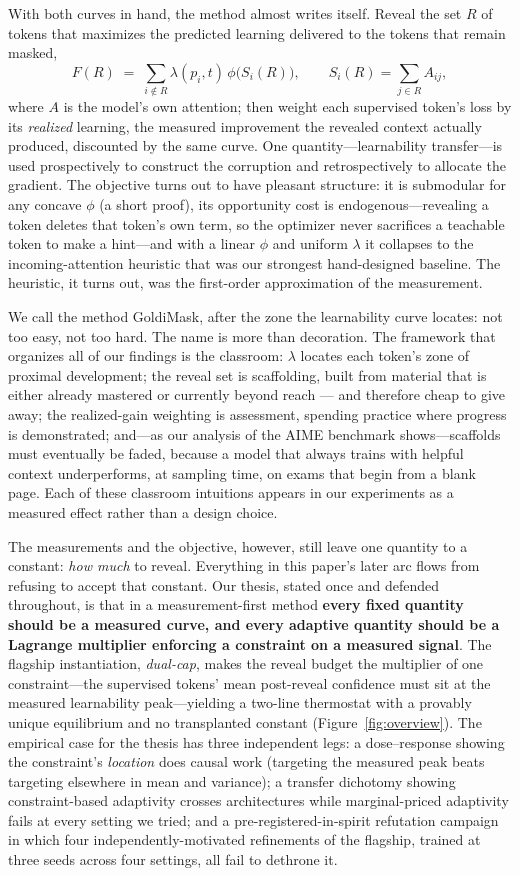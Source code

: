 \documentclass{article} %
\begin{document}
With both curves in hand, the method almost writes itself. Reveal the set $R$ of tokens that maximizes the predicted learning delivered to the tokens that remain masked,
\[
F(R) \;=\; \sum_{i \notin R} \lambda(p_i, t)\, \phi\!\big(S_i(R)\big),
\qquad S_i(R) = \sum_{j \in R} A_{ij},
\]
where $A$ is the model's own attention; then weight each supervised token's loss by its \emph{realized} learning, the measured improvement the revealed context actually produced, discounted by the same curve. One quantity---learnability transfer---is used prospectively to construct the corruption and retrospectively to allocate the gradient. The objective turns out to have pleasant structure: it is submodular for any concave $\phi$ (a short proof), its opportunity cost is endogenous---revealing a token deletes that token's own term, so the optimizer never sacrifices a teachable token to make a hint---and with a linear $\phi$ and uniform $\lambda$ it collapses to the incoming-attention heuristic that was our strongest hand-designed baseline. The heuristic, it turns out, was the first-order approximation of the measurement.

We call the method GoldiMask, after the zone the learnability curve locates: not too easy, not too hard. The name is more than decoration. The framework that organizes all of our findings is the classroom: $\lambda$ locates each token's zone of proximal development; the reveal set is scaffolding, built from material that is either already mastered or currently beyond reach --- and therefore cheap to give away; the realized-gain weighting is assessment, spending practice where progress is demonstrated; and---as our analysis of the AIME benchmark shows---scaffolds must eventually be faded, because a model that always trains with helpful context underperforms, at sampling time, on exams that begin from a blank page. Each of these classroom intuitions appears in our experiments as a measured effect rather than a design choice.

The measurements and the objective, however, still leave one quantity to a constant: \emph{how much} to reveal. Everything in this paper's later arc flows from refusing to accept that constant. Our thesis, stated once and defended throughout, is that in a measurement-first method \textbf{every fixed quantity should be a measured curve, and every adaptive quantity should be a Lagrange multiplier enforcing a constraint on a measured signal}. The flagship instantiation, \emph{dual-cap}, makes the reveal budget the multiplier of one constraint---the supervised tokens' mean post-reveal confidence must sit at the measured learnability peak---yielding a two-line thermostat with a provably unique equilibrium and no transplanted constant (Figure~\ref{fig:overview}). The empirical case for the thesis has three independent legs: a dose--response showing the constraint's \emph{location} does causal work (targeting the measured peak beats targeting elsewhere in mean and variance); a transfer dichotomy showing constraint-based adaptivity crosses architectures while marginal-priced adaptivity fails at every setting we tried; and a pre-registered-in-spirit refutation campaign in which four independently-motivated refinements of the flagship, trained at three seeds across four settings, all fail to dethrone it.
\end{document}
